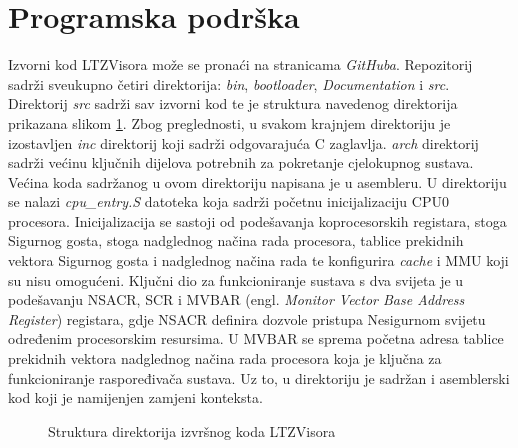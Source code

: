 \documentclass[times, utf8, diplomski, numeric]{fer}
\begin{document}
\section{Programska podrška}
Izvorni kod LTZVisora može se pronaći na stranicama \textit{GitHuba}. Repozitorij sadrži sveukupno četiri direktorija:
\textit{bin}, \textit{bootloader}, \textit{Documentation} i \textit{src}. Direktorij \textit{src} sadrži sav izvorni kod te
je struktura navedenog direktorija prikazana slikom \ref{srcdir}. Zbog preglednosti, u svakom krajnjem direktoriju je
izostavljen \textit{inc} direktorij koji sadrži odgovarajuća C zaglavlja.
\textit{arch} direktorij sadrži većinu ključnih dijelova potrebnih za pokretanje cjelokupnog sustava. Većina koda sadržanog u
ovom direktoriju napisana je u asembleru. U direktoriju se nalazi \textit{cpu\_entry.S} datoteka koja sadrži početnu
inicijalizaciju CPU0 procesora. Inicijalizacija se sastoji od podešavanja koprocesorskih registara, stoga Sigurnog gosta,
stoga nadglednog načina rada procesora, tablice prekidnih vektora Sigurnog gosta i nadglednog načina rada te konfigurira
\textit{cache} i MMU koji su nisu omogućeni. Ključni dio za funkcioniranje sustava s dva svijeta je u podešavanju NSACR, SCR
i MVBAR (engl. \textit{Monitor Vector Base Address Register}) registara, gdje NSACR definira dozvole pristupa Nesigurnom svijetu
određenim procesorskim resursima. U MVBAR se sprema početna adresa tablice prekidnih vektora nadglednog načina rada procesora
koja je ključna za funkcioniranje raspoređivača sustava. Uz to, u direktoriju je sadržan i asemblerski kod koji je namijenjen
zamjeni konteksta.

\begin{figure}[H]
  \centering
  \caption{Struktura direktorija izvršnog koda LTZVisora}
  \label{srcdir}
\end{figure}
\end{document}
